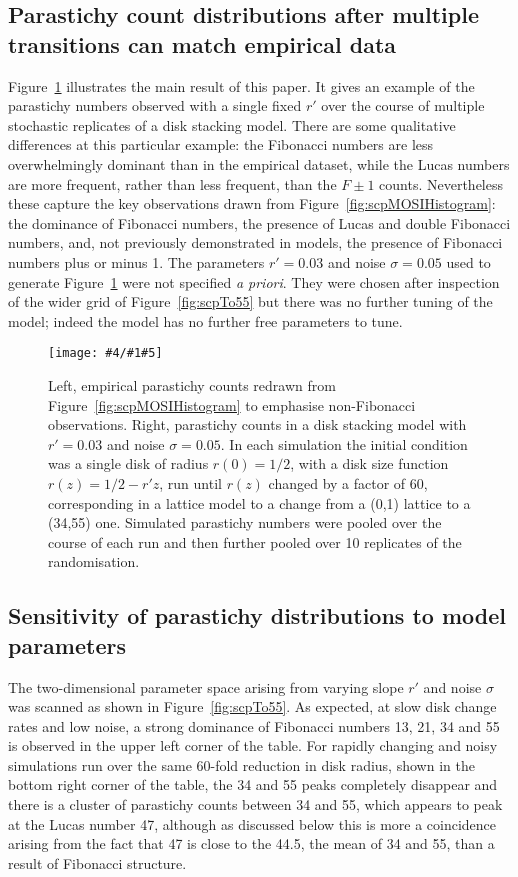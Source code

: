 \documentclass[a4paper,10pt]{amsart}
\newlength{\jfigwidth}
\newcommand{\pdffig}[3]{\jdofig{#1}{#2}{#3}{Figures}{.pdf}}
\newcommand{\jdofig}[5]{
	\begin{figure}\centering\texttt{[image: \#4/\#1\#5]} \caption{#2}\label{fig:#1}\end{figure}
}
\begin{document}
\subsection{Parastichy count distributions after multiple transitions can match empirical data}
Figure~\ref{fig:scpAhaPair} illustrates the main result of this paper. It gives an example of the parastichy numbers observed with a single fixed $r'$ over the course of multiple stochastic replicates of a disk stacking model.    There are some qualitative differences at this particular example: the Fibonacci numbers are less overwhelmingly dominant than in the empirical dataset, while the Lucas numbers are more frequent, rather than less frequent, than the $F\pm1$ counts. Nevertheless these capture the key observations drawn from  Figure~\ref{fig:scpMOSIHistogram}: the dominance of Fibonacci numbers, the  presence of Lucas and double Fibonacci numbers, and,  not previously demonstrated in models, the presence of Fibonacci numbers plus or minus 1. 
The parameters $r'=0.03$ and noise $\sigma=0.05$ used to generate Figure~\ref{fig:scpAhaPair} were not specified \textit{a priori}. They were chosen after inspection of the wider grid of Figure~\ref{fig:scpTo55} but there was no further tuning of the model;  indeed the model has no further free parameters to tune.

\pdffig{scpAhaPair}{Left, empirical parastichy counts redrawn from Figure~\ref{fig:scpMOSIHistogram} to emphasise non-Fibonacci observations. Right,  parastichy counts in a disk stacking model with $r'=0.03$ and noise $\sigma=0.05$. In each simulation the initial condition was a single disk of radius $r(0)=1/2$, with a disk size function $r(z)=1/2- r'z$, run until $r(z)$ changed by a factor of  60, corresponding in a lattice model to a change from a (0,1) lattice to a (34,55) one. 
	Simulated parastichy numbers were pooled over the course of each run and then further pooled over 10 replicates of the randomisation. }{1}

\subsection{Sensitivity of parastichy distributions to model parameters}

The two-dimensional parameter space arising from varying slope $r'$ and noise $\sigma$ was scanned as shown in  Figure~\ref{fig:scpTo55}. As expected, at slow disk change rates and low noise, a strong dominance of Fibonacci numbers 13, 21, 34 and 55 is observed in the upper left corner of the table. For rapidly changing and noisy simulations run over the same 60-fold reduction in disk radius, shown in the bottom right corner of the table, the 34 and 55 peaks completely disappear and there is a cluster of parastichy counts between 34 and 55, which appears to peak at the Lucas number 47, although as discussed below this is more a coincidence arising from the fact that 47 is close to the 44.5, the mean of 34 and 55, than a result of Fibonacci structure. 
\end{document}
